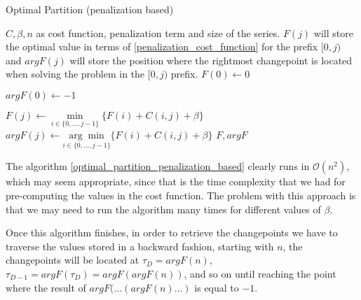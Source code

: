 \documentclass[pdflatex,sn-mathphys]{sn-jnl}%
\theoremstyle{thmstyleone}%
\theoremstyle{thmstyletwo}%
\theoremstyle{thmstylethree}%
\begin{document}
\begin{algorithm}[H]
\caption{Optimal Partition (penalization based)}\label{optimal_partition_penalization_based}
\begin{algorithmic}[1]
\Require $C, \beta, n$ as cost function, penalization term and size of the series. 
\Ensure $F(j)$ will store the optimal value in terms of \ref{penalization_cost_function} for the prefix $[0,j)$ and $argF(j)$ will store the position where the rightmost changepoint is located when solving the problem in the $[0,j)$ prefix. 
\State $F(0) \leftarrow 0$

\State 
{}
\State$argF(0) \leftarrow -1$
\State

 
  \State $F(j) \leftarrow \underset{i \in \{0, \dots, j-1\}}{\min} \{ F(i) + C(i,j) + \beta \}$ 
  \State $argF(j)\leftarrow \underset{i \in \{0, \dots, j-1\}}{\arg \min} \{ F(i) + C(i,j) + \beta \}$ 
\EndFor
\State \Return $F, argF$
\end{algorithmic}
\end{algorithm}

The algorithm \ref{optimal_partition_penalization_based} clearly runs in $\mathcal{O}(n^2)$, which may seem appropriate, since that is the time complexity that we had for pre-computing the values in the cost function. The problem with this approach is that we may need to run the algorithm many times for different values of $\beta$.

Once this algorithm finishes, in order to retrieve the changepoints we have to traverse the values stored in a backward fashion, starting with $n$, the changepoints will be located at $\tau_{D} = argF(n)$, $\tau_{D-1} = argF(\tau_{D}) =  argF(argF(n))$, and so on until reaching the point where the result of $argF(\dots(argF(n)\dots)$ is equal to $-1$.
\end{document}
